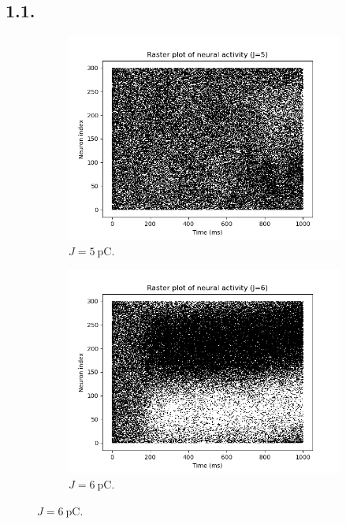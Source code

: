 \documentclass{article}
\begin{document}
\subsection*{1.1.}\label{sec:11}
\begin{figure}[h!]
  \centering
  \begin{subfigure}[b]{0.32\textwidth}
    \includegraphics[width=\textwidth]{figures/1.1.raster_plot_J5.png}
    \caption{\(J=\qty{5}{\pico\coulomb}\).}
    \label{fig:J5}
  \end{subfigure}
  \hfill
  \begin{subfigure}[b]{0.32\textwidth}
    \includegraphics[width=\textwidth]{figures/1.1.raster_plot_J6.png}
    \caption{\(J=\qty{6}{\pico\coulomb}\).}

\end{subfigure}
\end{figure}
\end{document}
